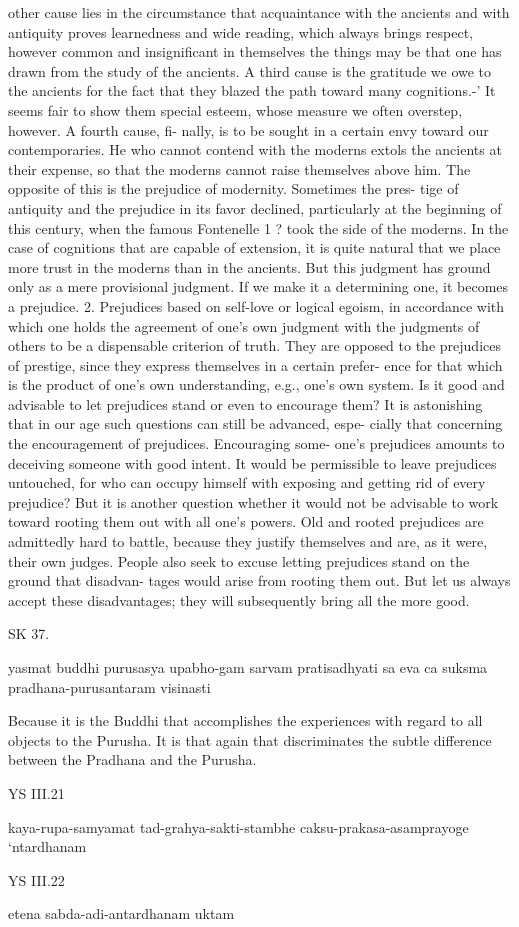 other cause lies in the circumstance that acquaintance with the ancients
and with antiquity proves learnedness and wide reading, which always
brings respect, however common and insignificant in themselves the
things may be that one has drawn from the study of the ancients. A third
cause is the gratitude we owe to the ancients for the fact that they blazed
the path toward many cognitions.-' It seems fair to show them special
esteem, whose measure we often overstep, however. A fourth cause, fi-
nally, is to be sought in a certain envy toward our contemporaries. He who
cannot contend with the moderns extols the ancients at their expense, so
that the moderns cannot raise themselves above him.
The opposite of this is the prejudice of modernity. Sometimes the pres-
tige of antiquity and the prejudice in its favor declined, particularly at the
beginning of this century, when the famous Fontenelle 1 ? took the side of
the moderns. In the case of cognitions that are capable of extension, it is
quite natural that we place more trust in the moderns than in the ancients.
But this judgment has ground only as a mere provisional judgment. If we
make it a determining one, it becomes a prejudice.
2. Prejudices based on self-love or logical egoism, in accordance with which
one holds the agreement of one's own judgment with the judgments of
others to be a dispensable criterion of truth. They are opposed to the
prejudices of prestige, since they express themselves in a certain prefer-
ence for that which is the product of one's own understanding, e.g., one's
own system.
Is it good and advisable to let prejudices stand or even to encourage them? It
is astonishing that in our age such questions can still be advanced, espe-
cially that concerning the encouragement of prejudices. Encouraging some-
one's prejudices amounts to deceiving someone with good intent. It would
be permissible to leave prejudices untouched, for who can occupy himself
with exposing and getting rid of every prejudice? But it is another question
whether it would not be advisable to work toward rooting them out with all
one's powers. Old and rooted prejudices are admittedly hard to battle,
because they justify themselves and are, as it were, their own judges. People
also seek to excuse letting prejudices stand on the ground that disadvan-
tages would arise from rooting them out. But let us always accept these
disadvantages; they will subsequently bring all the more good.

SK 37.

yasmat buddhi purusasya upabho-gam sarvam pratisadhyati
sa eva ca suksma pradhana-purusantaram visinasti

Because it is the Buddhi that accomplishes the experiences
with regard to all objects to the Purusha.
It is that again that discriminates the subtle difference
between the Pradhana and the Purusha.

YS III.21

    kaya-rupa-samyamat tad-grahya-sakti-stambhe caksu-prakasa-asamprayoge ‘ntardhanam

YS III.22

    etena sabda-adi-antardhanam uktam
